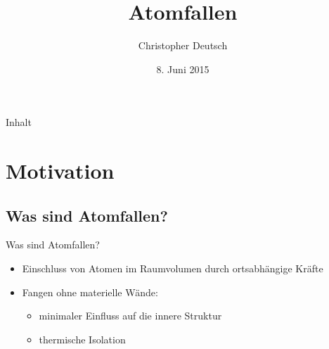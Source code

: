 \documentclass[12pt,xcolor=dvipsnames]{beamer}
\author[Christopher Deutsch]
{Christopher Deutsch}
\title
{Atomfallen}
\subtitle
{}
\institute[]
{Rheinische Friedrich-Wilhelms-Universität Bonn \\
Proseminar Präsentationstechnik SS15}
\date{8. Juni 2015}
\begin{document}
\maketitle

\begin{frame}{Inhalt}
	\tableofcontents
\end{frame}


\section{Motivation}

\subsection{Was sind Atomfallen?}
\begin{frame}{Was sind Atomfallen?}
	\begin{itemize}
		\item Einschluss von Atomen im Raumvolumen durch ortsabhängige Kräfte
		
		\item Fangen ohne materielle Wände:
		\begin{itemize}
			\item minimaler Einfluss auf die innere Struktur
			
			\item thermische Isolation
		\end{itemize}

	\end{itemize}
\end{frame}
\end{document}
